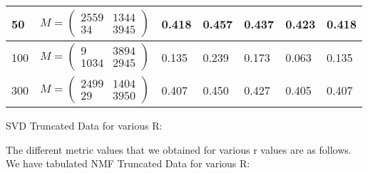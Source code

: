 \documentclass{article}
\begin{document}
\begin{center}
\begin{tabular}{ | m{1cm} | m{3cm}| m{2cm} | m{2cm} | m{2cm} | m{2cm} | m{2cm} | }
		\hline
		\textbf{50} & $$ M = \left( \begin{smallmatrix} 2559&1344\\ 34&3945 \end{smallmatrix} \right) $$ & 0.418& 0.457& 0.437& 0.423& 0.418\\
		\hline
		100 & $$ M = \left( \begin{smallmatrix} 9&3894\\ 1034&2945 \end{smallmatrix} \right) $$ & 0.135& 0.239& 0.173& 0.063& 0.135\\
		\hline
		300 & $$ M = \left( \begin{smallmatrix} 2499&1404\\ 29&3950 \end{smallmatrix} \right) $$ & 0.407& 0.450& 0.427& 0.405& 0.407\\
		\hline
	\end{tabular}
\end{center}
\vspace{5cm}

SVD Truncated Data for various R:\\
\begin{figure}[h]
	\centering
	\qquad
	
	\centering
	\qquad
	
	\centering
\end{figure}
\vspace{5cm}

The different metric values that we obtained for various r values are as follows. We have tabulated NMF Truncated Data for various R:\\
\end{document}
